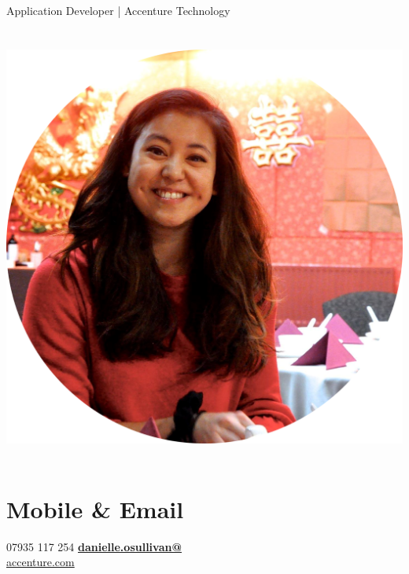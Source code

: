 \documentclass[]{friggeri-cv}
\begin{document}
      {\-\hspace{1.5cm} Application Developer | Accenture Technology}
      

\begin{aside}
  \section{}
    {\includegraphics[scale=0.1]{img/circledp.png}}
    ~
  \section{Mobile \& Email}
    07935 117 254
    \href{mailto:danielle.osullivan@accenture.com}{\textbf{danielle.osullivan@}\\accenture.com}
    ~

\end{aside}
\end{document}

